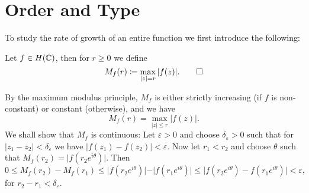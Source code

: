 \section{Order and Type}

To study the rate of growth of an entire function we first introduce the following:
\begin{definition}
    Let $f \in H(\mathbb{C})$, then for $r \geq 0$ we define
    \begin{equation*}
        M_f(r) \coloneqq \max_{\vert z \vert = r} \vert f(z) \vert. \qedhere
    \end{equation*}
\end{definition}

\begin{remark}    
    By the maximum modulus principle, $M_f$ is either strictly increasing (if $f$ is non-constant) or constant (otherwise), and we have
    $$ M_f(r) = \max_{\vert z \vert \leq r} \vert f(z) \vert. $$
    We shall show that $M_f$ is continuous: Let $\varepsilon > 0$ and choose $\delta_\varepsilon > 0$ such that for ${\vert z_1 - z_2 \vert < \delta_\varepsilon}$ we have ${\vert f(z_1) - f(z_2) \vert < \varepsilon}$. Now let $r_1 < r_2$ and choose $\theta$ such that $M_f(r_2) = \vert f(r_2 e^{i \theta}) \vert$. Then
    \begin{equation*}
        0 \leq M_f(r_2) - M_f(r_1) \leq \vert f(r_2 e^{i \theta}) \vert - \vert f(r_1 e^{i \theta}) \vert \leq \vert f(r_2 e^{i \theta}) - f(r_1 e^{i \theta}) \vert < \varepsilon,
    \end{equation*}
    for $r_2 - r_1 < \delta_\varepsilon$.
\end{remark}



